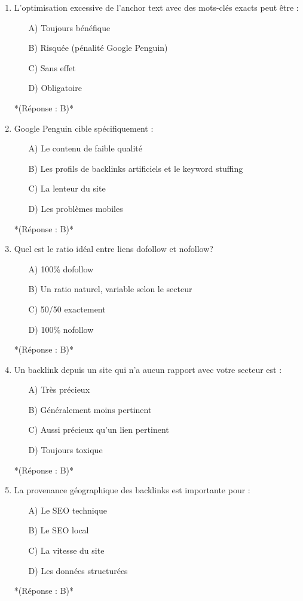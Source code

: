 \documentclass[12pt,a4paper,twoside]{report}
\begin{document}
\begin{enumerate}
\item L'optimisation excessive de l'anchor text avec des mots-clés exacts peut être :
\begin{itemize}
\item[A)] Toujours bénéfique
\item[B)] Risquée (pénalité Google Penguin)
\item[C)] Sans effet
\item[D)] Obligatoire
\end{itemize}
*(Réponse : B)*

\item Google Penguin cible spécifiquement :
\begin{itemize}
\item[A)] Le contenu de faible qualité
\item[B)] Les profils de backlinks artificiels et le keyword stuffing
\item[C)] La lenteur du site
\item[D)] Les problèmes mobiles
\end{itemize}
*(Réponse : B)*

\item Quel est le ratio idéal entre liens dofollow et nofollow?
\begin{itemize}
\item[A)] 100\% dofollow
\item[B)] Un ratio naturel, variable selon le secteur
\item[C)] 50/50 exactement
\item[D)] 100\% nofollow
\end{itemize}
*(Réponse : B)*

\item Un backlink depuis un site qui n'a aucun rapport avec votre secteur est :
\begin{itemize}
\item[A)] Très précieux
\item[B)] Généralement moins pertinent
\item[C)] Aussi précieux qu'un lien pertinent
\item[D)] Toujours toxique
\end{itemize}
*(Réponse : B)*

\item La provenance géographique des backlinks est importante pour :
\begin{itemize}
\item[A)] Le SEO technique
\item[B)] Le SEO local
\item[C)] La vitesse du site
\item[D)] Les données structurées
\end{itemize}
*(Réponse : B)*


\end{enumerate}
\end{document}
